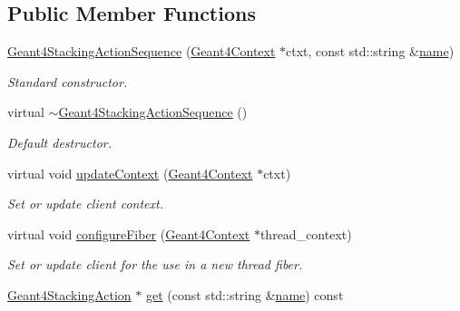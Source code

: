 \subsection*{Public Member Functions}
\begin{DoxyCompactItemize}
\item 
\hyperlink{class_d_d4hep_1_1_simulation_1_1_geant4_stacking_action_sequence_a31b87eca5a3b72b827bc837bd99ed58b}{Geant4\+Stacking\+Action\+Sequence} (\hyperlink{class_d_d4hep_1_1_simulation_1_1_geant4_context}{Geant4\+Context} $\ast$ctxt, const std\+::string \&\hyperlink{class_d_d4hep_1_1_simulation_1_1_geant4_action_af374e70b014d16afb81dd9d77cc3894b}{name})
\begin{DoxyCompactList}\small\item\em Standard constructor. \end{DoxyCompactList}\item 
virtual \hyperlink{class_d_d4hep_1_1_simulation_1_1_geant4_stacking_action_sequence_af4cadf550f682910d7eee326802859d8}{$\sim$\+Geant4\+Stacking\+Action\+Sequence} ()
\begin{DoxyCompactList}\small\item\em Default destructor. \end{DoxyCompactList}\item 
virtual void \hyperlink{class_d_d4hep_1_1_simulation_1_1_geant4_stacking_action_sequence_a093447274a6d135bc1d69fe96ed0961c}{update\+Context} (\hyperlink{class_d_d4hep_1_1_simulation_1_1_geant4_context}{Geant4\+Context} $\ast$ctxt)
\begin{DoxyCompactList}\small\item\em Set or update client context. \end{DoxyCompactList}\item 
virtual void \hyperlink{class_d_d4hep_1_1_simulation_1_1_geant4_stacking_action_sequence_af292bcae909cc6b7bc4a94c0f0e07b9c}{configure\+Fiber} (\hyperlink{class_d_d4hep_1_1_simulation_1_1_geant4_context}{Geant4\+Context} $\ast$thread\+\_\+context)
\begin{DoxyCompactList}\small\item\em Set or update client for the use in a new thread fiber. \end{DoxyCompactList}\item 
\hyperlink{class_d_d4hep_1_1_simulation_1_1_geant4_stacking_action}{Geant4\+Stacking\+Action} $\ast$ \hyperlink{class_d_d4hep_1_1_simulation_1_1_geant4_stacking_action_sequence_afdb4f97bef2944e720a1313c66dab393}{get} (const std\+::string \&\hyperlink{class_d_d4hep_1_1_simulation_1_1_geant4_action_af374e70b014d16afb81dd9d77cc3894b}{name}) const

\end{DoxyCompactItemize}
